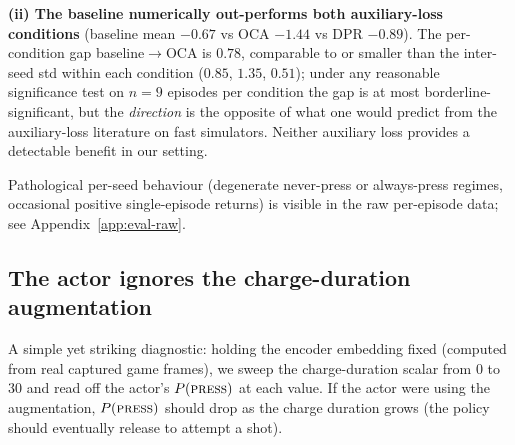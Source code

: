 \documentclass{article}
\begin{document}
\textbf{(ii) The baseline numerically out-performs both
auxiliary-loss conditions} (baseline mean $-0.67$ vs OCA $-1.44$
vs DPR $-0.89$). The per-condition gap baseline$\to$OCA is
$0.78$, comparable to or smaller than the inter-seed std within
each condition ($0.85$, $1.35$, $0.51$); under any reasonable
significance test on $n=9$ episodes per condition the gap is at
most borderline-significant, but the \emph{direction} is the
opposite of what one would predict from the auxiliary-loss
literature on fast simulators. Neither auxiliary loss provides a
detectable benefit in our setting.

Pathological per-seed behaviour (degenerate never-press or
always-press regimes, occasional positive single-episode returns)
is visible in the raw per-episode data; see Appendix~\ref{app:eval-raw}.

\subsection{The actor ignores the charge-duration augmentation}
\label{sec:charge-ignored}

A simple yet striking diagnostic: holding the encoder embedding
fixed (computed from real captured game frames), we sweep the
charge-duration scalar from $0$ to $30$ and read off the actor's
$P(\textsc{press})$ at each value. If the actor were using the
augmentation, $P(\textsc{press})$ should drop as the charge
duration grows (the policy should eventually release to attempt
a shot).
\end{document}
